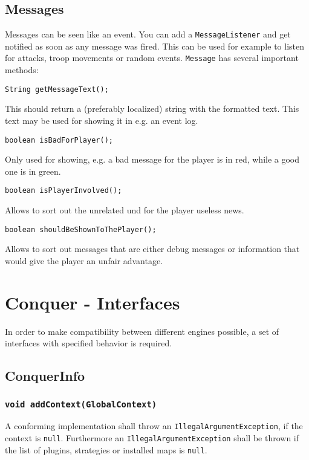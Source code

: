 \documentclass{article}
\begin{document}
\subsection{Messages}
Messages can be seen like an event. You can add a \texttt{MessageListener} and get notified as soon as any message was fired. This can be used for example to listen for attacks, troop movements or random events.
\texttt{Message} has several important methods:
\begin{verbatim}
String getMessageText();
\end{verbatim}
This should return a (preferably localized) string with the formatted text. This text may be used for showing it in e.g. an event log.
\begin{verbatim}
boolean isBadForPlayer();
\end{verbatim}
Only used for showing, e.g. a bad message for the player is in red, while a good one is in green.
\begin{verbatim}
boolean isPlayerInvolved();
\end{verbatim}
Allows to sort out the unrelated und for the player useless news.
\begin{verbatim}
boolean shouldBeShownToThePlayer();
\end{verbatim}
Allows to sort out messages that are either debug messages or information that would give the player an unfair advantage.

\newpage

\section{Conquer - Interfaces}

In order to make compatibility between different engines possible, a 
set of interfaces with specified behavior is required.

\subsection{ConquerInfo}

\subsubsection{\texttt{void addContext(GlobalContext)}}
A conforming implementation shall throw an \texttt{IllegalArgumentException}, if the context is \texttt{null}.
Furthermore an \texttt{IllegalArgumentException} shall be thrown if the list
of plugins, strategies or installed maps is \texttt{null}.
\end{document}
